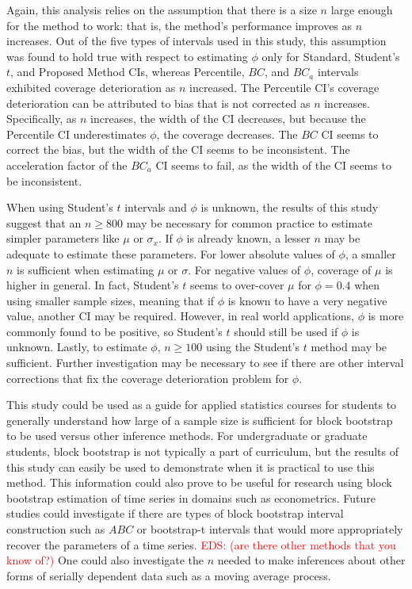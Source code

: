 \documentclass[12pt, letterpaper, titlepage]{article}
\newcommand{\eds}[1]{\textcolor{red}{EDS: (#1)}}
\begin{document}
Again, this analysis relies on the assumption that
there is a size $n$ large enough for the method to work: that is, the method's
performance improves as $n$ increases. Out of the five types of intervals used
in this study, this assumption was found to hold true with respect to
estimating $\phi$ only for Standard, Student's $t$, and Proposed Method CIs, 
whereas Percentile, 
$BC$, and $BC_a$ intervals exhibited coverage deterioration as $n$
increased. The Percentile CI's coverage deterioration can be attributed to
bias that is not corrected as $n$ increases. Specifically, as $n$ increases, 
the width of the CI decreases, but because the Percentile CI
underestimates $\phi$, the coverage decreases. The $BC$ CI seems to correct
the 
bias, but the width of the CI seems to be inconsistent. The acceleration 
factor of the $BC_a$ CI seems to fail, as the width of the CI
seems to be inconsistent. 


When using Student's $t$ intervals and $\phi$ is
unknown, the results of this study suggest that an $n \geq 800$ may be
necessary for common practice to estimate simpler parameters like $\mu$ 
or $\sigma_x$. If $\phi$ is already known, a lesser $n$ may be adequate
to
estimate these parameters. For lower absolute values of $\phi$, a smaller
$n$ is sufficient when estimating $\mu$ or $\sigma$. For negative
values of $\phi$, coverage of $\mu$ is higher in general. In fact, 
Student's $t$ seems to over-cover $\mu$ for $\phi = 0.4$ when using smaller
sample sizes, 
meaning that if $\phi$ is known to have a very negative value, another CI
may be required.
However, in real world applications, $\phi$ is
more commonly found to be positive, so Student's $t$ should still be used
if $\phi$ is unknown.
Lastly, to estimate $\phi$, $n \geq 100$ using the 
Student's $t$ method
 may be sufficient.
Further investigation may be necessary to see if there are other interval
corrections that fix the coverage deterioration problem for $\phi$.


This study could be used as a guide for applied statistics courses for students
to generally understand how large of a sample size is sufficient for block
bootstrap to be used versus other inference methods. For undergraduate or
graduate students, block bootstrap is not typically a part of curriculum, but the 
results of this study can easily be used to demonstrate when it is practical to use 
this method.
This information could also prove to be useful for research using block
bootstrap
estimation of time series in domains such as econometrics. Future studies
could investigate if there are types of block bootstrap interval
construction such as $ABC$ or bootstrap-t intervals
that would more appropriately recover the parameters of a time
series. \eds{are there other methods that you know of?} 
One could also investigate the $n$ needed to make inferences about
other forms of serially dependent data such as a moving average process. 




\end{document}
